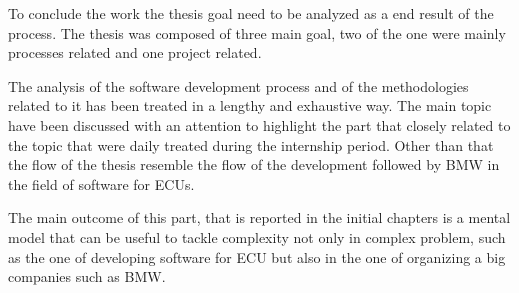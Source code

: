 \documentclass[../main.tex]{subfiles}
\begin{document}
To conclude the work the thesis goal need to be analyzed as a end result of the process. The thesis was composed of three main goal, two of the one were mainly processes related and one project related. 

The analysis of the software development process and of the methodologies related to it has been treated in a lengthy and exhaustive way. The main topic have been discussed with an attention to highlight the part that closely related to the topic that were daily treated during the internship period. Other than that the flow of the thesis resemble the flow of the development followed by \gls{BMW} in the field of software for \gls{ECU}s. 

The main outcome of this part, that is reported in the initial chapters is a mental model that can be useful to tackle complexity not only in complex problem, such as the one of developing software for \gls{ECU} but also in the one of organizing a big companies such as \gls{BMW}.
\end{document}
